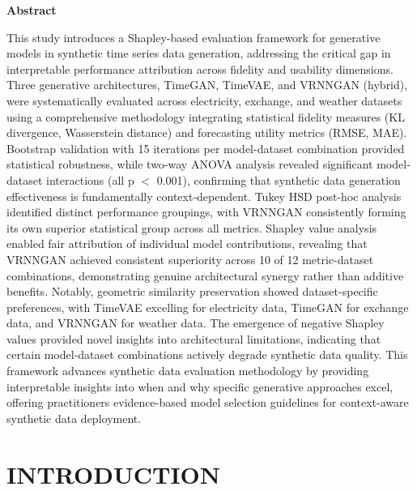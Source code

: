 \documentclass{article}
\begin{document}
\begin{center}
\Large\textbf{Abstract}
\end{center}

\vspace{1em} %

This study introduces a Shapley-based evaluation framework for generative models in synthetic time series data generation, addressing the critical gap in interpretable performance attribution across fidelity and usability dimensions. Three generative architectures, TimeGAN, TimeVAE, and VRNNGAN (hybrid), were systematically evaluated across electricity, exchange, and weather datasets using a comprehensive methodology integrating statistical fidelity measures (KL divergence, Wasserstein distance) and forecasting utility metrics (RMSE, MAE). Bootstrap validation with 15 iterations per model-dataset combination provided statistical robustness, while two-way ANOVA analysis revealed significant model-dataset interactions (all p $<$ 0.001), confirming that synthetic data generation effectiveness is fundamentally context-dependent. Tukey HSD post-hoc analysis identified distinct performance groupings, with VRNNGAN consistently forming its own superior statistical group across all metrics. Shapley value analysis enabled fair attribution of individual model contributions, revealing that VRNNGAN achieved consistent superiority across 10 of 12 metric-dataset combinations, demonstrating genuine architectural synergy rather than additive benefits. Notably, geometric similarity preservation showed dataset-specific preferences, with TimeVAE excelling for electricity data, TimeGAN for exchange data, and VRNNGAN for weather data. The emergence of negative Shapley values provided novel insights into architectural limitations, indicating that certain model-dataset combinations actively degrade synthetic data quality. This framework advances synthetic data evaluation methodology by providing interpretable insights into when and why specific generative approaches excel, offering practitioners evidence-based model selection guidelines for context-aware synthetic data deployment.

\newpage
\tableofcontents
\newpage

\listoffigures
\newpage

\listoftables
\newpage

\setcounter{page}{1}
\section{INTRODUCTION}
\end{document}
